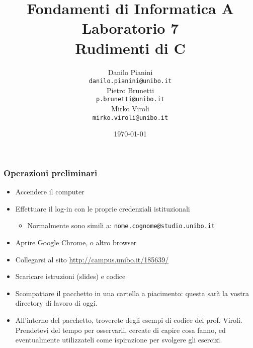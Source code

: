 \documentclass{beamer}
\begin{document}
\title[Lab1 - FV]{Fondamenti di Informatica A \\ Laboratorio 7 \\ Rudimenti di C}
\author[Danilo Pianini]{Danilo Pianini\\\texttt{danilo.pianini@unibo.it} \\ \vspace{3pt} Pietro Brunetti \\\texttt{p.brunetti@unibo.it} \\ \vspace{3pt} Mirko Viroli\\\texttt{mirko.viroli@unibo.it} }
\date[\today]{\today}

\frame{\titlepage} 

\begin{frame}
\frametitle{Operazioni preliminari}
\begin{itemize}
 \item Accendere il computer
 \item Effettuare il log-in con le proprie credenziali istituzionali
  \begin{itemize}
    \item Normalmente sono simili a: \texttt{nome.cognome@studio.unibo.it}
  \end{itemize}
 \item Aprire Google Chrome, o altro browser
 \item Collegarsi al sito \url{http://campus.unibo.it/185639/}
 \item Scaricare istruzioni (slides) e codice
 \item Scompattare il pacchetto in una cartella a piacimento: questa sarà la vostra directory di lavoro di oggi.
 \item All'interno del pacchetto, troverete degli esempi di codice del prof. Viroli. Prendetevi del tempo per osservarli, cercate di capire cosa fanno, ed eventualmente utilizzateli come ispirazione per svolgere gli esercizi.
\end{itemize}
\end{frame}
\end{document}
